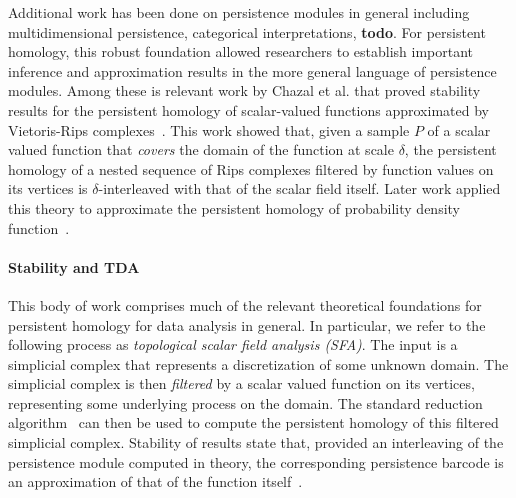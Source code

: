 Additional work has been done on persistence modules in general including multidimensional persistence, categorical interpretations, \textbf{todo}.
For persistent homology, this robust foundation allowed researchers to establish important inference and approximation results in the more general language of persistence modules.
Among these is relevant work by Chazal et al. that proved stability results for the persistent homology of scalar-valued functions approximated by Vietoris-Rips complexes~\cite{chazal09analysis}.
This work showed that, given a sample $P$ of a scalar valued function that \emph{covers} the domain of the function at scale $\delta$, the persistent homology of a nested sequence of Rips complexes filtered by function values on its vertices is $\delta$-interleaved with that of the scalar field itself.
Later work applied this theory to approximate the persistent homology of probability density function~\cite{chazal2013persistence}.

\paragraph{Stability and TDA}

This body of work comprises much of the relevant theoretical foundations for persistent homology for data analysis in general.
In particular, we refer to the following process as \emph{topological scalar field analysis (SFA)}.
The input is a simplicial complex that represents a discretization of some unknown domain.
The simplicial complex is then \emph{filtered} by a scalar valued function on its vertices, representing some underlying process on the domain.
The standard reduction algorithm~\cite{edelsbrunner02simplification,zomorodian05computing} can then be used to compute the persistent homology of this filtered simplicial complex.
Stability of results state that, provided an interleaving of the persistence module computed in theory, the corresponding persistence barcode is an approximation of that of the function itself~\cite{cohensteiner07stability,chazal09proximity}.

%
%




